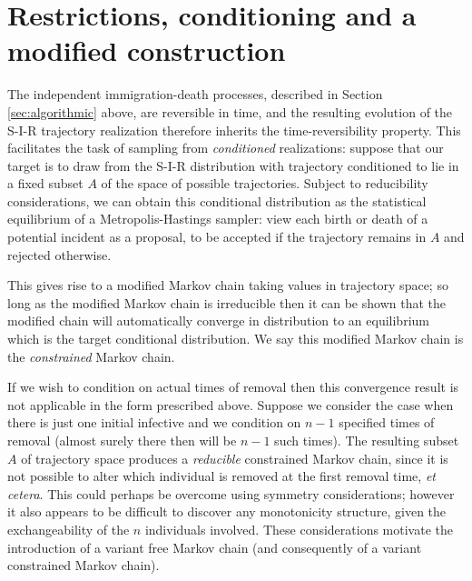 \documentclass[]{article}
\newcommand{\SIR}{S-I-R\xspace}
\begin{document}
 \section{Restrictions, conditioning and a modified construction}\label{sec:restrictions}
%
 The independent immigration-death processes, described in Section \ref{sec:algorithmic} above, are reversible in time, 
 and the resulting evolution of the \SIR trajectory realization therefore inherits the time-reversibility property. 
 This facilitates the task of sampling from \emph{conditioned} realizations: 
 suppose that our target is to draw from the \SIR distribution with trajectory conditioned to lie in a fixed subset \(A\) of the space of possible trajectories.
 Subject to reducibility considerations, we can obtain this conditional distribution as the statistical equilibrium of a Metropolis-Hastings sampler: 
 view each birth or death of a potential incident as a proposal, to be accepted if the trajectory remains in \(A\) and rejected otherwise.


 
 This gives rise to a modified Markov chain taking values in trajectory space; 
 so long as the modified Markov chain is irreducible%
 then it can be shown that the modified chain will automatically converge in distribution to an equilibrium which is the target conditional distribution.
 We say this modified Markov chain is the \emph{constrained} Markov chain.

 If we wish to condition on actual times of removal then this convergence result is not applicable in the form prescribed above.
 Suppose we consider the case when there is just one initial infective and we condition on \(n-1\) specified times of removal (almost surely there then will be \(n-1\) such times).
 The resulting subset \(A\) of trajectory space produces a \emph{reducible} constrained Markov chain, since it is not possible to alter which individual is removed at the first removal time, \emph{et cetera}.
 This could perhaps be overcome using symmetry considerations;
 however it also appears to be difficult to discover any monotonicity structure, given the exchangeability of the \(n\) individuals involved.
 These considerations motivate the introduction of a variant free Markov chain (and consequently of a variant constrained Markov chain).
\end{document}
